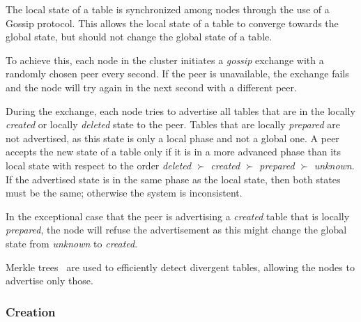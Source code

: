 The local state of a table is synchronized among nodes through the use of a
Gossip protocol.
This allows the local state of a table to converge towards the global state,
but should not change the global state of a table.

To achieve this, each node in the cluster initiates a \emph{gossip} exchange
with a randomly chosen peer every second.
If the peer is unavailable, the exchange fails and the node will try again in
the next second with a different peer.

During the exchange, each node tries to advertise all tables that are in the
locally \emph{created} or locally \emph{deleted} state to the peer.
Tables that are locally \emph{prepared} are not advertised, as this state is
only a local phase and not a global one.
A peer accepts the new state of a table only if it is in a more advanced phase
than its local state with respect to the order \emph{deleted} $\succ$
\emph{created} $\succ$ \emph{prepared} $\succ$ \emph{unknown}.
If the advertised state is in the same phase as the local state, then both
states must be the same; otherwise the system is inconsistent.

In the exceptional case that the peer is advertising a \emph{created} table
that is locally \emph{prepared}, the node will refuse the advertisement as this
might change the global state from \emph{unknown} to \emph{created}.

Merkle trees~\cite{MerkleTree} are used to efficiently detect divergent tables,
allowing the nodes to advertise only those.

\subsubsection{Creation}
\label{subsubsec:creation}

